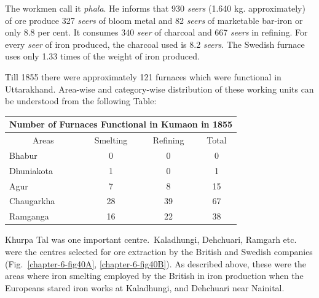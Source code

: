 The workmen call it {\it phala}. He informs that 930 {\it seers} (1.640 kg. approximately) of ore produce 327 {\it seers} of bloom metal and 82 {\it seers} of marketable bar-iron or only 8.8 per cent. It consumes 340 {\it seer} of charcoal and 667 {\it seers} in refining. For every {\it seer} of iron produced, the charcoal used is 8.2 {\it seers}. The Swedish furnace uses only 1.33 times of the weight of iron produced. 

Till 1855 there were approximately 121 furnaces which were functional in Uttarakhand. Area-wise and category-wise distribution of these working units can be understood from the following Table:

\vspace{-.3cm}

{\fontsize{8}{10}\selectfont\begin{longtable}{|l|c|c|c|}
\multicolumn{4}{c}{\textbf{Number of Furnaces Functional in Kumaon in 1855}}\\[2pt]
\hline 
\multicolumn{1}{|c|}{Areas} & Smelting & Refining & Total\\
\hline
Bhabur & 0 & 0 & 0\\
\hline
Dhuniakota & 1 & 0 &1\\
\hline
Agur & 7 & 8 &15\\
\hline
Chaugarkha & 28 & 39 & 67\\
\hline
Ramganga & 16 & 22 & 38\\
\hline
\end{longtable}}

\vspace{-.3cm}

Khurpa Tal was one important centre.~Kaladhungi, Dehchuari, Ramgarh etc. were the centres selected for ore extraction by the British and Swedish companies (Fig.~\ref{chapter-6-fig40A}, \ref{chapter-6-fig40B}). As described above, these were the areas where iron smelting employed by the British in iron production when the Europeans stared iron works at Kaladhungi, and Dehchuari near Nainital.

\newpage

